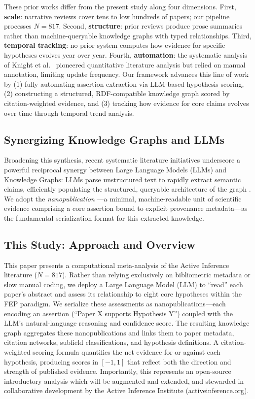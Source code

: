 \documentclass[
  english,
]{article}
\begin{document}
These prior works differ from the present study along four dimensions.
First, \textbf{scale}: narrative reviews cover tens to low hundreds of
papers; our pipeline processes \(N = 817\). Second, \textbf{structure}:
prior reviews produce prose summaries rather than machine-queryable
knowledge graphs with typed relationships. Third, \textbf{temporal
tracking}: no prior system computes how evidence for specific hypotheses
evolves year over year. Fourth, \textbf{automation}: the systematic
analysis of Knight et al.~\citep{knight2022fep} pioneered quantitative
literature analysis but relied on manual annotation, limiting update
frequency. Our framework advances this line of work by (1) fully
automating assertion extraction via LLM-based hypothesis scoring, (2)
constructing a structured, RDF-compatible knowledge graph scored by
citation-weighted evidence, and (3) tracking how evidence for core
claims evolves over time through temporal trend analysis.

\subsection{Synergizing Knowledge Graphs and
LLMs}\label{synergizing-knowledge-graphs-and-llms}

Broadening this synthesis, recent systematic literature initiatives
underscore a powerful reciprocal synergy between Large Language Models
(LLMs) and Knowledge Graphs: LLMs parse unstructured text to rapidly
extract semantic claims, efficiently populating the structured,
queryable architecture of the graph
\citep{quevedo2025combining, li2024unifying}. We adopt the
\emph{nanopublication} \citep{groth2010anatomy}---a minimal,
machine-readable unit of scientific evidence comprising a core assertion
bound to explicit provenance metadata---as the fundamental serialization
format for this extracted knowledge.

\subsection{This Study: Approach and
Overview}\label{this-study-approach-and-overview}

This paper presents a computational meta-analysis of the Active
Inference literature (\(N = 817\)). Rather than relying exclusively on
bibliometric metadata or slow manual coding, we deploy a Large Language
Model (LLM) to ``read'' each paper's abstract and assess its
relationship to eight core hypotheses within the FEP paradigm. We
serialize these assessments as nanopublications---each encoding an
assertion (``Paper X supports Hypothesis Y'') coupled with the LLM's
natural-language reasoning and confidence score. The resulting knowledge
graph aggregates these nanopublications and links them to paper
metadata, citation networks, subfield classifications, and hypothesis
definitions. A citation-weighted scoring formula quantifies the net
evidence for or against each hypothesis, producing scores in \([-1, 1]\)
that reflect both the direction and strength of published evidence.
Importantly, this represents an open-source introductory analysis which
will be augmented and extended, and stewarded in collaborative
development by the Active Inference Institute (activeinference.org).
\end{document}
